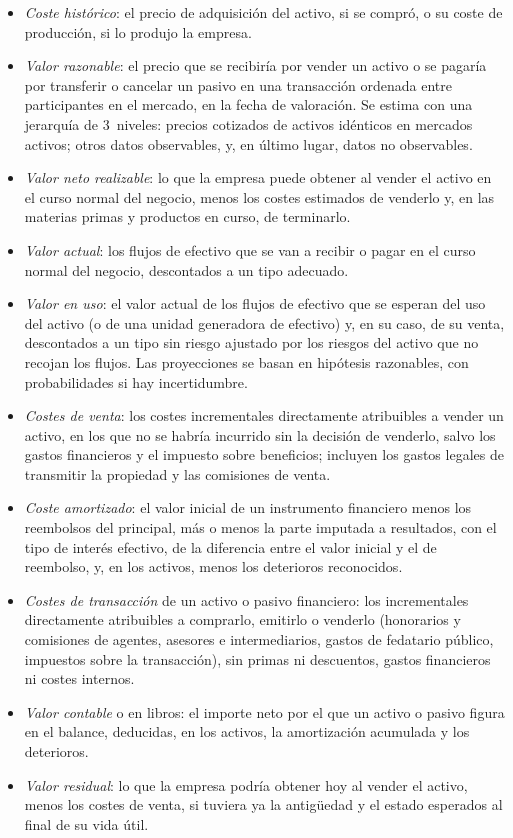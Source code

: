 \documentclass[11pt]{article}
\begin{document}
\begin{itemize}
\item \emph{Coste histórico}: el precio de adquisición del activo, si se compró, o su coste de producción, si lo produjo la empresa.
\item \emph{Valor razonable}: el precio que se recibiría por vender un activo o se pagaría por transferir o cancelar un pasivo en una transacción ordenada entre participantes en el mercado, en la fecha de valoración. Se estima con una jerarquía de 3~niveles: precios cotizados de activos idénticos en mercados activos; otros datos observables, y, en último lugar, datos no observables\nocite{BOE2021RD1}.
\item \emph{Valor neto realizable}: lo que la empresa puede obtener al vender el activo en el curso normal del negocio, menos los costes estimados de venderlo y, en las materias primas y productos en curso, de terminarlo.
\item \emph{Valor actual}: los flujos de efectivo que se van a recibir o pagar en el curso normal del negocio, descontados a un tipo adecuado.
\item \emph{Valor en uso}: el valor actual de los flujos de efectivo que se esperan del uso del activo (o de una unidad generadora de efectivo) y, en su caso, de su venta, descontados a un tipo sin riesgo ajustado por los riesgos del activo que no recojan los flujos. Las proyecciones se basan en hipótesis razonables, con probabilidades si hay incertidumbre.
\item \emph{Costes de venta}: los costes incrementales directamente atribuibles a vender un activo, en los que no se habría incurrido sin la decisión de venderlo, salvo los gastos financieros y el impuesto sobre beneficios; incluyen los gastos legales de transmitir la propiedad y las comisiones de venta.
\item \emph{Coste amortizado}: el valor inicial de un instrumento financiero menos los reembolsos del principal, más o menos la parte imputada a resultados, con el tipo de interés efectivo, de la diferencia entre el valor inicial y el de reembolso, y, en los activos, menos los deterioros reconocidos.
\item \emph{Costes de transacción} de un activo o pasivo financiero: los incrementales directamente atribuibles a comprarlo, emitirlo o venderlo (honorarios y comisiones de agentes, asesores e intermediarios, gastos de fedatario público, impuestos sobre la transacción), sin primas ni descuentos, gastos financieros ni costes internos.
\item \emph{Valor contable} o en libros: el importe neto por el que un activo o pasivo figura en el balance, deducidas, en los activos, la amortización acumulada y los deterioros.
\item \emph{Valor residual}: lo que la empresa podría obtener hoy al vender el activo, menos los costes de venta, si tuviera ya la antigüedad y el estado esperados al final de su vida útil.
\end{itemize}
\end{document}
